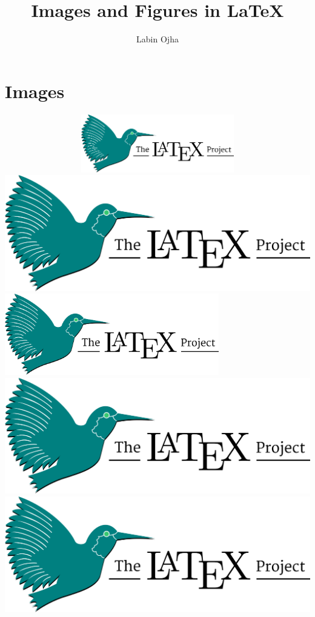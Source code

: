 \documentclass{article}
\author{Labin Ojha}
\title{Images and Figures in {\LaTeX}}
\begin{document}
\maketitle


\section{Images}

\begin{center}
    \includegraphics[width=8in,height=1in,keepaspectratio]{LaTeX_project_logo_bird.svg.png}
    \includegraphics[width=\textwidth]{LaTeX_project_logo_bird.svg.png}
    \includegraphics[width=0.7\textwidth]{LaTeX_project_logo_bird.svg.png}
    \includegraphics[scale=0.15]{LaTeX_project_logo_bird.svg.png}
    \includegraphics[scale=0.15,angle=30]{LaTeX_project_logo_bird.svg.png}
\end{center}
\end{document}
